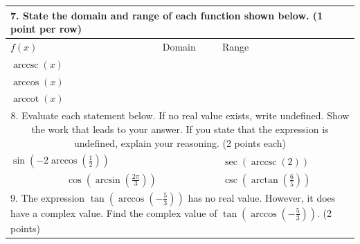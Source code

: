 \documentclass[10pt]{article}
\begin{document}
\begin{center}
\begin{tabular}{|l|l|l|}
\hline
\multicolumn{3}{|l|}{7. State the domain and range of each function shown below. (1 point per row)} \\
\hline
$f(x)$ & Domain & Range \\
\hline
$\operatorname{arccsc}(x)$ &  &  \\
\hline
$\arccos (x)$ &  &  \\
\hline
$\operatorname{arccot}(x)$ &  &  \\
\hline
\multicolumn{3}{|c|}{8. Evaluate each statement below. If no real value exists, write undefined. Show the work that leads to your answer. If you state that the expression is undefined, explain your reasoning. (2 points each)} \\
\hline
$\sin \left(-2 \arccos \left(\frac{1}{2}\right)\right)$ &  & $\sec (\operatorname{arccsc}(2))$ \\
\hline
\multicolumn{2}{|c|}{$\cos \left(\arcsin \left(\frac{2 \pi}{3}\right)\right)$} & $\csc \left(\arctan \left(\frac{6}{5}\right)\right)$ \\
\hline
\multicolumn{3}{|l|}{9. The expression $\tan \left(\arccos \left(-\frac{5}{3}\right)\right)$ has no real value. However, it does have a complex value. Find the complex value of $\tan \left(\arccos \left(-\frac{5}{3}\right)\right)$. (2 points)} \\
\hline
\end{tabular}
\end{center}
\end{document}
